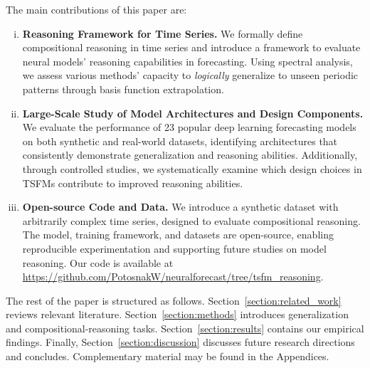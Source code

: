 The main contributions of this paper are:
\begin{enumerate}[(i)]
\item \textbf{Reasoning Framework for Time Series.} We formally define compositional reasoning in time series and introduce a framework to evaluate neural models' reasoning capabilities in forecasting. Using spectral analysis, we assess various methods' capacity to \emph{logically} generalize to unseen periodic patterns through basis function extrapolation.

\item \textbf{Large-Scale Study of Model Architectures and Design Components.} We evaluate the performance of 23 popular deep learning forecasting models on both synthetic and real-world datasets, identifying architectures that consistently demonstrate generalization and reasoning abilities. Additionally, through controlled studies, we systematically examine which design choices in TSFMs contribute to improved reasoning abilities.

\item \textbf{Open-source Code and Data.}
We introduce a synthetic dataset with arbitrarily complex time series, designed to evaluate compositional reasoning. The model, training framework, and datasets are open-source, enabling reproducible experimentation and supporting future studies on model reasoning. Our code is available at %
\url{https://github.com/PotosnakW/neuralforecast/tree/tsfm_reasoning}.
\end{enumerate}

The rest of the paper is structured as follows. Section~\ref{section:related_work} reviews relevant literature. Section~\ref{section:methods} introduces generalization and compositional-reasoning tasks. Section~\ref{section:results} contains our empirical findings. Finally, Section~\ref{section:discussion} discusses future research directions
and concludes. Complementary material may be found in the Appendices.
